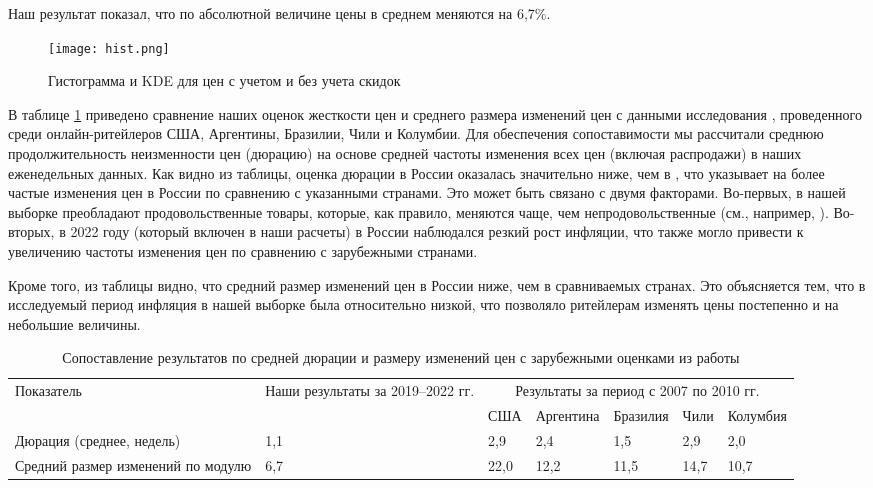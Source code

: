 Наш результат показал, что по абсолютной величине цены в среднем меняются на 6,7\%. 

\begin{figure}[h!]
	\centering
	\texttt{[image: hist.png]} %
	\caption{Гистограмма и KDE для цен с учетом и без учета скидок}
	\label{fig:hist}
\end{figure}

В таблице \ref{tab:comparison} приведено сравнение наших оценок жесткости цен и среднего размера изменений цен с данными исследования \cite{cavallo2018scraped}, проведенного среди онлайн-ритейлеров США, Аргентины, Бразилии, Чили и Колумбии. Для обеспечения сопоставимости мы рассчитали среднюю продолжительность неизменности цен (дюрацию) на основе средней частоты изменения всех цен (включая распродажи) в наших еженедельных данных. Как видно из таблицы, оценка дюрации в России оказалась значительно ниже, чем в \cite{cavallo2018scraped}, что указывает на более частые изменения цен в России по сравнению с указанными странами. Это может быть связано с двумя факторами. Во-первых, в нашей выборке преобладают продовольственные товары, которые, как правило, меняются чаще, чем непродовольственные (см., например, \cite{bils2004some}). Во-вторых, в 2022 году (который включен в наши расчеты) в России наблюдался резкий рост инфляции, что также могло привести к увеличению частоты изменения цен по сравнению с зарубежными странами.

Кроме того, из таблицы видно, что средний размер изменений цен в России ниже, чем в сравниваемых странах. Это объясняется тем, что в исследуемый период инфляция в нашей выборке была относительно низкой, что позволяло ритейлерам изменять цены постепенно и на небольшие величины.

\begin{table}[h]
	\centering
	\small %
	\caption{Сопоставление результатов по средней дюрации и размеру изменений цен с зарубежными оценками из работы \cite{cavallo2018scraped}}
	\label{tab:comparison}
	\begin{tabularx}{\textwidth}{|X|X|X|X|X|X|X|} %
		\hline
		Показатель & Наши результаты за 2019–2022 гг. & \multicolumn{5}{c|}{Результаты \cite{cavallo2018scraped} за период с 2007 по 2010 гг.} \\
		\cline{3-7}
		&  & США & Аргентина & Бразилия & Чили & Колумбия \\
		\hline
		Дюрация (среднее, недель) & 1,1 & 2,9 & 2,4 & 1,5 & 2,9 & 2,0 \\
		\hline
		Средний размер изменений по модулю & 6,7 & 22,0 & 12,2 & 11,5 & 14,7 & 10,7 \\
		\hline
	\end{tabularx}
\end{table}

